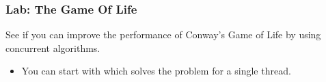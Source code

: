 
\begin{frame}
\frametitle{Lab: The Game Of Life}
See if you can improve the performance of Conway's Game of Life by using
concurrent algorithms. 
\begin{itemize}
\item You can start with  which solves the problem for a single thread. 
\end{itemize}


\end{frame}
